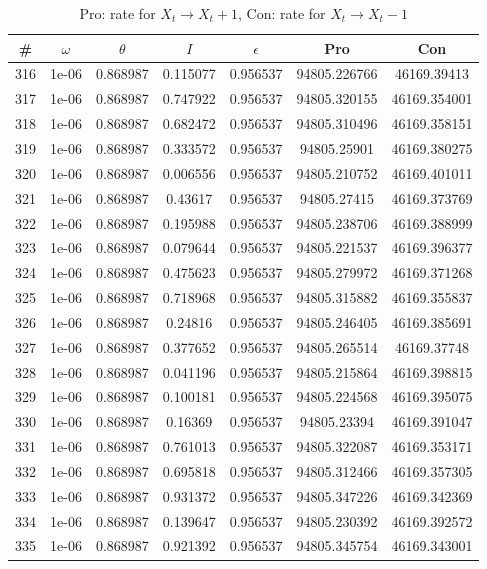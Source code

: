 \newpage
\begin{table}
\caption{Pro: rate for $X_t \rightarrow X_t + 1$, Con: rate for $X_t \rightarrow X_t - 1$}
\begin{tabular*}{\linewidth}{c|c|c|c|c|c|c}
\# & $\omega$ & $\theta$ & $I$ & $\epsilon$ & Pro & Con \\
\hline
316 & 1e-06 & 0.868987 & 0.115077 & 0.956537 & 94805.226766 & 46169.39413\\
317 & 1e-06 & 0.868987 & 0.747922 & 0.956537 & 94805.320155 & 46169.354001\\
318 & 1e-06 & 0.868987 & 0.682472 & 0.956537 & 94805.310496 & 46169.358151\\
319 & 1e-06 & 0.868987 & 0.333572 & 0.956537 & 94805.25901 & 46169.380275\\
320 & 1e-06 & 0.868987 & 0.006556 & 0.956537 & 94805.210752 & 46169.401011\\
321 & 1e-06 & 0.868987 & 0.43617 & 0.956537 & 94805.27415 & 46169.373769\\
322 & 1e-06 & 0.868987 & 0.195988 & 0.956537 & 94805.238706 & 46169.388999\\
323 & 1e-06 & 0.868987 & 0.079644 & 0.956537 & 94805.221537 & 46169.396377\\
324 & 1e-06 & 0.868987 & 0.475623 & 0.956537 & 94805.279972 & 46169.371268\\
325 & 1e-06 & 0.868987 & 0.718968 & 0.956537 & 94805.315882 & 46169.355837\\
326 & 1e-06 & 0.868987 & 0.24816 & 0.956537 & 94805.246405 & 46169.385691\\
327 & 1e-06 & 0.868987 & 0.377652 & 0.956537 & 94805.265514 & 46169.37748\\
328 & 1e-06 & 0.868987 & 0.041196 & 0.956537 & 94805.215864 & 46169.398815\\
329 & 1e-06 & 0.868987 & 0.100181 & 0.956537 & 94805.224568 & 46169.395075\\
330 & 1e-06 & 0.868987 & 0.16369 & 0.956537 & 94805.23394 & 46169.391047\\
331 & 1e-06 & 0.868987 & 0.761013 & 0.956537 & 94805.322087 & 46169.353171\\
332 & 1e-06 & 0.868987 & 0.695818 & 0.956537 & 94805.312466 & 46169.357305\\
333 & 1e-06 & 0.868987 & 0.931372 & 0.956537 & 94805.347226 & 46169.342369\\
334 & 1e-06 & 0.868987 & 0.139647 & 0.956537 & 94805.230392 & 46169.392572\\
335 & 1e-06 & 0.868987 & 0.921392 & 0.956537 & 94805.345754 & 46169.343001\\

\end{tabular*}
\end{table}
